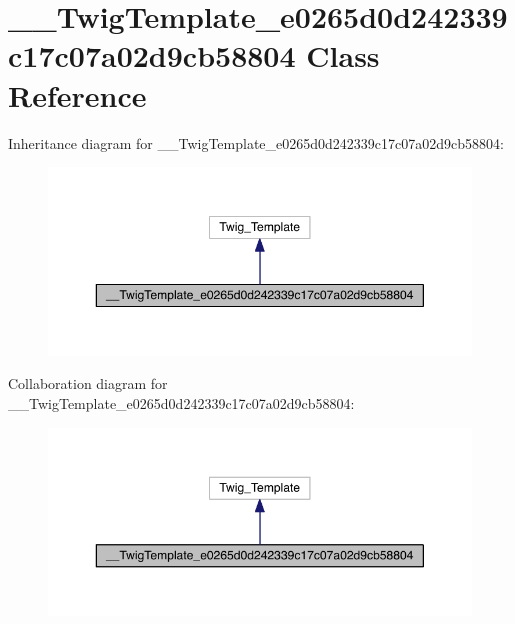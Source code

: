 \hypertarget{class_____twig_template__e0265d0d242339c17c07a02d9cb58804}{\section{\-\_\-\-\_\-\-Twig\-Template\-\_\-e0265d0d242339c17c07a02d9cb58804 Class Reference}
\label{class_____twig_template__e0265d0d242339c17c07a02d9cb58804}
}


Inheritance diagram for \-\_\-\-\_\-\-Twig\-Template\-\_\-e0265d0d242339c17c07a02d9cb58804\-:
\nopagebreak
\begin{figure}[H]
\begin{center}
\leavevmode
\includegraphics[width=350pt]{class_____twig_template__e0265d0d242339c17c07a02d9cb58804__inherit__graph}
\end{center}
\end{figure}


Collaboration diagram for \-\_\-\-\_\-\-Twig\-Template\-\_\-e0265d0d242339c17c07a02d9cb58804\-:
\nopagebreak
\begin{figure}[H]
\begin{center}
\leavevmode
\includegraphics[width=350pt]{class_____twig_template__e0265d0d242339c17c07a02d9cb58804__coll__graph}
\end{center}
\end{figure}
